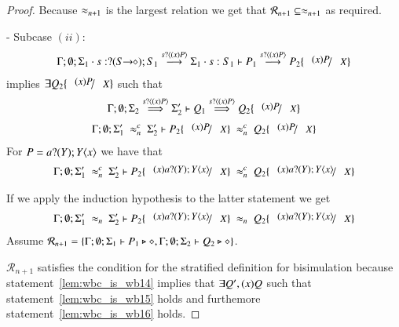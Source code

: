 \begin{proof}
	\noi Because $\approx_{n+1}$ is the largest relation we get that $\mathcal{R}_{n+1} \subseteq \approx_{n+1}$ as required.

	\noi - Subcase $(ii)$:
%
	\begin{eqnarray}
		\Gamma; \emptyset; \Sigma_1 \cat s: \btinp{\shot{S}} S_1 \by{\bactinp{s}{\abs{x} P}} \Sigma_1 \cat s: S_1 \proves P_1 \by{\bactinp{s}{\abs{x} P}} P_2 \subst{(x) P}{X}
		\label{lem:wbc_is_wb14}
	\end{eqnarray}
%
	implies
	$\exists Q_2 \subst{(x) P}{X}$ such that
	\begin{eqnarray}
		\Gamma; \emptyset; \Sigma_2 \By{\bactinp{s}{\abs{x} P}} \Sigma_2' \proves Q_1 \By{\bactinp{s}{\abs{x} P}} Q_2 \subst{(x) P}{X}  \label{lem:wbc_is_wb15}
	\end{eqnarray}
%
	\begin{eqnarray*}
		\Gamma; \emptyset; \Sigma_1'\ \wbc_{n}\ \Sigma_2' \proves P_2 \subst{(x) P}{X}\ \wbc_{n}\ Q_2 \subst{(x) P}{X}
	\end{eqnarray*}
%
	\noi For $P = a ? (Y) ; Y\langle x \rangle$ we have that 
%
	\begin{eqnarray*}
		\Gamma; \emptyset; \Sigma_1'\ \wbc_{n}\ \Sigma_2' \proves P_2 \subst{(x) \binp{a}{Y} \appl{Y}{x}}{X}\ \wbc_{n}\ Q_2 \subst{(x) \binp{a}{Y} \appl{Y}{x}}{X}
	\end{eqnarray*}
%

	\noi If we apply the induction hypothesis to the latter statement we get
%
	\begin{eqnarray}
		\Gamma; \emptyset; \Sigma_1'\ \wb_{n}\ \Sigma_2' \proves P_2 \subst{(x) \binp{a}{Y} \appl{Y}{x}}{X}\ \wb_{n}\ Q_2 \subst{(x) \binp{a}{Y} \appl{Y}{x}}{X}
		\label{lem:wbc_is_wb16}
	\end{eqnarray}
%
	\noi Assume $\mathcal{R}_{n+1} = \{\Gamma; \emptyset; \Sigma_1 \vdash P_1 \triangleright \diamond, \Gamma; \emptyset; \Sigma_2 \vdash Q_2 \triangleright \diamond\}$.

	\noi $\mathcal{R}_{n+1}$ satisfies the condition for the stratified definition for bisimulation
	because statement~\ref{lem:wbc_is_wb14} implies that
	$\exists Q', (x)Q$ such that
	statement~\ref{lem:wbc_is_wb15} holds and furthemore statement~\ref{lem:wbc_is_wb16} holds.


\end{proof}
